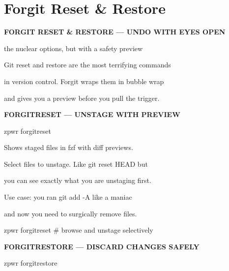 \documentclass[11pt,a4paper,twoside]{book}
\begin{document}
\vspace{16pt}

\section{Forgit Reset \& Restore}


\vspace{10pt}
{\large\bfseries\color{neoncyan} FORGIT RESET \& RESTORE — UNDO WITH EYES OPEN}\vspace{6pt}

the nuclear options, but with a safety preview

Git reset and restore are the most terrifying commands

\begin{codebox}
in version control. Forgit wraps them in bubble wrap\\
\end{codebox}

and gives you a preview before you pull the trigger.


\vspace{12pt}
{\bfseries\color{neonyellow} FORGITRESET — UNSTAGE WITH PREVIEW}\vspace{4pt}

\begin{codebox}
zpwr forgitreset\\
\end{codebox}

Shows staged files in fzf with diff previews.

Select files to unstage. Like git reset HEAD but

you can see exactly what you are unstaging first.

Use case: you ran git add -A like a maniac

and now you need to surgically remove files.

\begin{codebox}
zpwr forgitreset    \# browse and unstage selectively\\
\end{codebox}


\vspace{12pt}
{\bfseries\color{neonyellow} FORGITRESTORE — DISCARD CHANGES SAFELY}\vspace{4pt}

\begin{codebox}
zpwr forgitrestore\\
\end{codebox}
\end{document}
